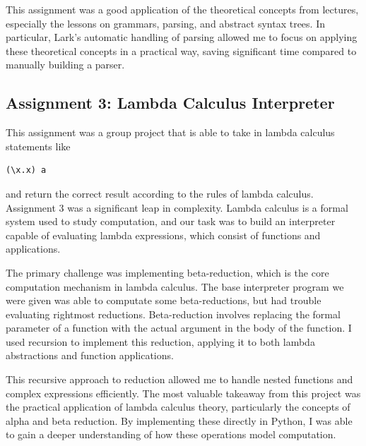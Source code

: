 \documentclass{article}
\theoremstyle{theorem}
\theoremstyle{definition}
\theoremstyle{remark}
\begin{document}
This assignment was a good application of the theoretical concepts from lectures, especially the 
lessons on grammars, parsing, and abstract syntax trees. In particular, Lark’s automatic handling 
of parsing allowed me to focus on applying these theoretical concepts in a practical way, saving 
significant time compared to manually building a parser.
\subsection*{Assignment 3: Lambda Calculus Interpreter}
This assignment was a group project that is able to take in lambda calculus statements like 
\begin{verbatim}(\x.x) a\end{verbatim} and return the correct result according to the rules of
lambda calculus. Assignment 3 was a significant leap in complexity. Lambda calculus is a formal 
system used to study computation, and our task was to build an interpreter capable of evaluating 
lambda expressions, which consist of functions and applications.

The primary challenge was implementing beta-reduction, which is the core computation mechanism in lambda calculus. 
The base interpreter program we were given was able to computate some beta-reductions, but had trouble 
evaluating rightmost reductions. Beta-reduction involves replacing the formal parameter of a function with the 
actual argument in the body of the function. I used recursion 
to implement this reduction, applying it to both lambda abstractions and function applications.

This recursive approach to reduction allowed me to handle nested functions and complex expressions efficiently. 
The most valuable takeaway from this project was the practical application of lambda calculus theory, particularly 
the concepts of alpha and beta reduction. By implementing these directly in Python, I was able to gain a deeper understanding 
of how these operations model computation.
\end{document}
